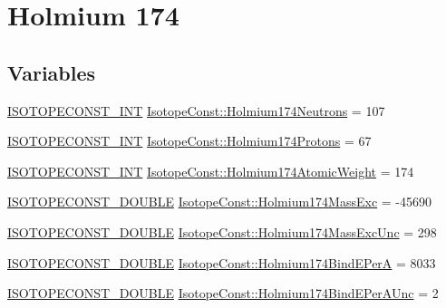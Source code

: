 \hypertarget{group___isotope_const-_holmium-_ho174}{}\section{Holmium 174}
\label{group___isotope_const-_holmium-_ho174}
\subsection*{Variables}
\begin{DoxyCompactItemize}
\item 
\mbox{\hyperlink{group___isotope_const-_macros_ga5f18360b3e99483a35c32d789e62621c}{I\+S\+O\+T\+O\+P\+E\+C\+O\+N\+S\+T\+\_\+\+I\+NT}} \mbox{\hyperlink{group___isotope_const-_holmium-_ho174_gab3a9f9578dd4b0f44371b8e274f299e3}{Isotope\+Const\+::\+Holmium174\+Neutrons}} = 107
\item 
\mbox{\hyperlink{group___isotope_const-_macros_ga5f18360b3e99483a35c32d789e62621c}{I\+S\+O\+T\+O\+P\+E\+C\+O\+N\+S\+T\+\_\+\+I\+NT}} \mbox{\hyperlink{group___isotope_const-_holmium-_ho174_ga13bd37248f78b3a45be24d112c12ec43}{Isotope\+Const\+::\+Holmium174\+Protons}} = 67
\item 
\mbox{\hyperlink{group___isotope_const-_macros_ga5f18360b3e99483a35c32d789e62621c}{I\+S\+O\+T\+O\+P\+E\+C\+O\+N\+S\+T\+\_\+\+I\+NT}} \mbox{\hyperlink{group___isotope_const-_holmium-_ho174_ga06a3eb6a6764bb3efc4bf7f9073582d1}{Isotope\+Const\+::\+Holmium174\+Atomic\+Weight}} = 174
\item 
\mbox{\hyperlink{group___isotope_const-_macros_ga8f45a7272ce02c0b4c65c44636ed719a}{I\+S\+O\+T\+O\+P\+E\+C\+O\+N\+S\+T\+\_\+\+D\+O\+U\+B\+LE}} \mbox{\hyperlink{group___isotope_const-_holmium-_ho174_ga7dacf81fb08372b48e29970b23cb6836}{Isotope\+Const\+::\+Holmium174\+Mass\+Exc}} = -\/45690
\item 
\mbox{\hyperlink{group___isotope_const-_macros_ga8f45a7272ce02c0b4c65c44636ed719a}{I\+S\+O\+T\+O\+P\+E\+C\+O\+N\+S\+T\+\_\+\+D\+O\+U\+B\+LE}} \mbox{\hyperlink{group___isotope_const-_holmium-_ho174_ga9a54c4a8cb2d5c69699b792089be498d}{Isotope\+Const\+::\+Holmium174\+Mass\+Exc\+Unc}} = 298
\item 
\mbox{\hyperlink{group___isotope_const-_macros_ga8f45a7272ce02c0b4c65c44636ed719a}{I\+S\+O\+T\+O\+P\+E\+C\+O\+N\+S\+T\+\_\+\+D\+O\+U\+B\+LE}} \mbox{\hyperlink{group___isotope_const-_holmium-_ho174_ga38918850b2f44a4d9ae24c2705c78c72}{Isotope\+Const\+::\+Holmium174\+Bind\+E\+PerA}} = 8033
\item 
\mbox{\hyperlink{group___isotope_const-_macros_ga8f45a7272ce02c0b4c65c44636ed719a}{I\+S\+O\+T\+O\+P\+E\+C\+O\+N\+S\+T\+\_\+\+D\+O\+U\+B\+LE}} \mbox{\hyperlink{group___isotope_const-_holmium-_ho174_ga22d9a7528443211ba84d666f4b60dd7e}{Isotope\+Const\+::\+Holmium174\+Bind\+E\+Per\+A\+Unc}} = 2

\end{DoxyCompactItemize}
